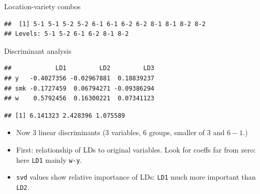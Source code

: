 \begin{frame}[fragile]{Location-variety combos}
  
\begin{knitrout}
\color{fgcolor}\begin{kframe}
\begin{alltt}
\hlkwb{=}\hlstd{=}\hlstd{))}
\hlkwb{=}
\end{alltt}
\begin{verbatim}
##  [1] 5-1 5-1 5-2 5-2 6-1 6-1 6-2 6-2 8-1 8-1 8-2 8-2
## Levels: 5-1 5-2 6-1 6-2 8-1 8-2
\end{verbatim}
\end{kframe}
\end{knitrout}

  
\end{frame}

\begin{frame}[fragile]{Discriminant analysis}
  
\begin{knitrout}
\color{fgcolor}\begin{kframe}
\begin{alltt}
\hlkwb{=}\hlopt{~}\hlopt{+}\hlopt{+}
\hlopt{$}
\end{alltt}
\begin{verbatim}
##            LD1         LD2         LD3
## y   -0.4027356 -0.02967881  0.18839237
## smk -0.1727459  0.06794271 -0.09386294
## w    0.5792456  0.16300221  0.07341123
\end{verbatim}
\begin{alltt}
\hlopt{$}
\end{alltt}
\begin{verbatim}
## [1] 6.141323 2.428396 1.075589
\end{verbatim}
\end{kframe}
\end{knitrout}

\begin{itemize}
\item Now 3 linear discriminants (3 variables, 6 groups, smaller of 3
  and $6-1$.)
\item First: relationship of LDs to original variables. Look for
  coeffs far from zero: here \texttt{LD1} mainly \texttt{w-y}.
\item \texttt{svd} values show relative importance of LDs:
  \texttt{LD1} much more important than \texttt{LD2}.
\end{itemize}
\end{frame}

